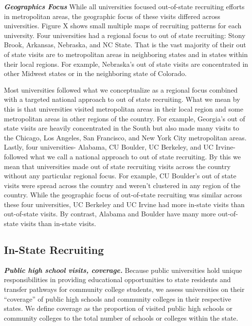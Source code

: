 \documentclass[twoside]{article}
\begin{document}
\textbf{\textit{Geographics Focus}} While all universities focused out-of-state recruiting efforts in metropolitan areas, the geographic focus of these visits differed across universities. Figure X shows small multiple maps of recruiting patterns for each university. Four universities had a regional focus to out of state recruiting: Stony Brook, Arkansas, Nebraska, and NC State. That is the vast majority of their out of state visits are to metropolitan areas in neighboring states and in states within their local regions. For example, Nebraska's out of state visits are concentrated in other Midwest states or in the neighboring state of Colorado. 

Most universities followed what we conceptualize as a regional focus combined with a targeted national approach to out of state recruiting. What we mean by this is that universities visited metropolitan areas in their local region and some metropolitan areas in other regions of the country. For example, Georgia's out of state visits are heavily concentrated in the South but also made many visits to the Chicago, Los Angeles, San Francisco, and New York City metropolitan areas. Lastly, four universities- Alabama, CU Boulder, UC Berkeley, and UC Irvine- followed what we call a national approach to out of state recruiting. By this we mean that universities made out of state recruiting visits across the country without any particular regional focus. For example, CU Boulder's out of state visits were spread across the country and weren't clustered in any region of the country.  While the geographic focus of out-of-state recruiting was similar across these four universities, UC Berkeley and UC Irvine had more in-state visits than out-of-state visits. By contrast, Alabama and Boulder have many more out-of-state visits than in-state visits. 

\subsection*{In-State Recruiting}
\textbf{\textit{Public high school visits, coverage.}} Because public universities hold unique responsibilities in providing educational opportunities to state residents and transfer pathways for community college students, we assess universities on their “coverage” of public high schools and community colleges in their respective states. We define coverage as the proportion of visited public high schools or community colleges to the total number of schools or colleges within the state.
\end{document}
